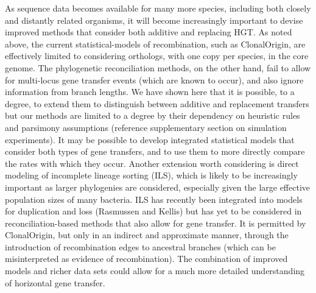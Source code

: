 \documentclass[12pt]{article}
\begin{document}
As sequence data becomes available for many more species, including both
closely and distantly related organisms, it will become increasingly
important to devise improved methods that consider both additive and
replacing HGT.  As noted above, the current statistical-models of
recombination, such as ClonalOrigin, are effectively limited to considering
orthologs, with one copy per species, in the core genome.  The phylogenetic
reconciliation methods, on the other hand, fail to allow for multi-locus
gene transfer events (which are known to occur), and also ignore
information from branch lengths.  We have shown here that it is possible,
to a degree, to extend them to distinguish between additive and replacement
transfers but our methods are limited to a degree by their dependency on
heuristic rules and parsimony assumptions (reference supplementary section
on simulation experiments).  It may be possible to develop integrated
statistical models that consider both types of gene transfers, and to use
them to more directly compare the rates with which they occur.  Another
extension worth considering is direct modeling of incomplete lineage
sorting (ILS), which is likely to be increasingly important as larger
phylogenies are considered, especially given the large effective population
sizes of many bacteria.  ILS has recently been integrated into models for
duplication and loss (Rasmussen and Kellis) but has yet to be considered in
reconciliation-based methods that also allow for gene transfer.  It is
permitted by ClonalOrigin, but only in an indirect and approximate manner,
through the introduction of recombination edges to ancestral branches
(which can be misinterpreted as evidence of recombination).  The
combination of improved models and richer data sets could allow for a much
more detailed understanding of horizontal gene transfer.
\end{document}
